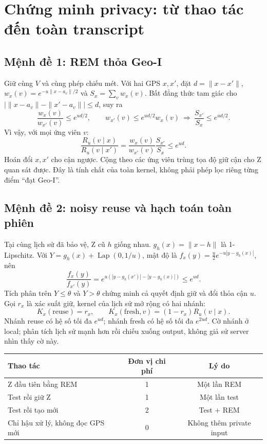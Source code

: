 \documentclass[10pt,a4paper]{article}
\begin{document}
\clearpage
\section{Chứng minh privacy: từ thao tác đến toàn transcript}
\subsection{Mệnh đề 1: REM thỏa Geo-I}
Giữ cùng $V$ và cùng phép chiếu mét. Với hai GPS $x,x'$, đặt $d=\|x-x'\|$,
$w_x(v)=e^{-u\|x-a_v\|/2}$ và $S_x=\sum_vw_x(v)$.
Bất đẳng thức tam giác cho $|\|x-a_v\|-\|x'-a_v\||\le d$, suy ra
\begin{equation}
\frac{w_x(v)}{w_{x'}(v)}\le e^{ud/2},\qquad
w_{x'}(v)\le e^{ud/2}w_x(v)\ \Longrightarrow\ \frac{S_{x'}}{S_x}\le e^{ud/2}.
\end{equation}
Vì vậy, với mọi ứng viên $v$:
\begin{equation}
\boxed{\frac{R_u(v\mid x)}{R_u(v\mid x')}
=\frac{w_x(v)}{w_{x'}(v)}\frac{S_{x'}}{S_x}\le e^{ud}.}
\label{eq:remproof}
\end{equation}
Hoán đổi $x,x'$ cho cận ngược. Cộng theo các ứng viên trùng tọa độ giữ cận cho Z quan sát được.
Đây là tính chất của toàn kernel, không phải phép lọc riêng từng điểm ``đạt Geo-I''.

\subsection{Mệnh đề 2: noisy reuse và hạch toán toàn phiên}
Tại cùng lịch sử đã bảo vệ, Z cũ $h$ giống nhau. $g_h(x)=\|x-h\|$ là 1-Lipschitz.
Với $Y=g_h(x)+\operatorname{Lap}(0,1/u)$, mật độ là $f_x(y)=\frac u2e^{-u|y-g_h(x)|}$, nên
\begin{equation}
\frac{f_x(y)}{f_{x'}(y)}
=e^{u(|y-g_h(x')|-|y-g_h(x)|)}\le e^{ud}.
\label{eq:test}
\end{equation}
Tích phân trên $Y\le\theta$ và $Y>\theta$ chứng minh cả quyết định giữ và đổi thỏa cận $u$.
Gọi $r_x$ là xác suất giữ, kernel của lịch sử mở rộng có hai nhánh:
\[
K_x(\mathrm{reuse})=r_x,\qquad K_x(\mathrm{fresh},v)=(1-r_x)R_u(v\mid x).
\]
Nhánh reuse có hệ số tối đa $e^{ud}$; nhánh fresh có hệ số tối đa $e^{2ud}$.
Cờ nhánh ở local; phân tích lịch sử mạnh hơn rồi chiếu xuống output, không giả sử server nhìn thấy cờ này.

\begin{tabularx}{\linewidth}{@{}Ycc@{}}\toprule
\textbf{Thao tác} & \textbf{Đơn vị chi phí} & \textbf{Lý do}\\\midrule
Z đầu tiên bằng REM & 1 & Một lần REM\\
Test rồi giữ Z & 1 & Một lần test\\
Test rồi tạo mới & 2 & Test + REM\\
Chỉ hậu xử lý, không đọc GPS mới & 0 & Không thêm private input\\\bottomrule
\end{tabularx}
\end{document}
